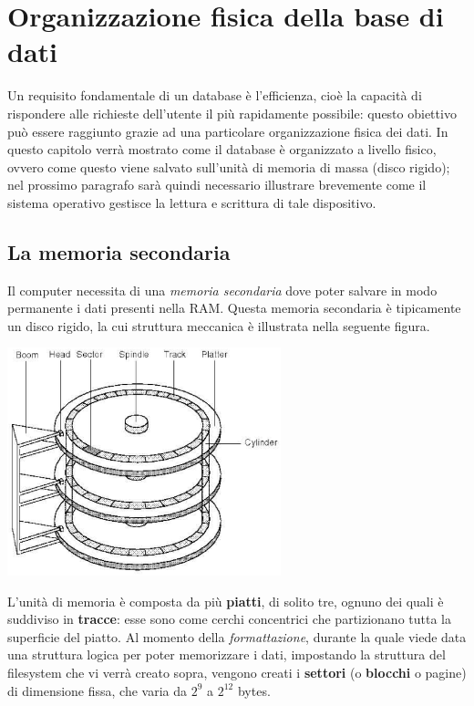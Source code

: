 \section{Organizzazione fisica della base di dati}

Un requisito fondamentale di un database è l'efficienza, cioè la capacità di rispondere alle 
richieste dell'utente il più rapidamente possibile: questo obiettivo può essere raggiunto grazie
ad una particolare organizzazione fisica dei dati. In questo capitolo verrà mostrato come il database
è organizzato a livello fisico, ovvero come questo viene salvato sull'unità di memoria 
di massa (disco rigido); nel prossimo paragrafo sarà quindi necessario illustrare brevemente come il
sistema operativo gestisce la lettura e scrittura di tale dispositivo.

\subsection{La memoria secondaria}
Il computer necessita di una \emph{memoria secondaria} dove poter salvare in modo permanente
i dati presenti nella RAM. Questa memoria secondaria è tipicamente un disco rigido, la cui struttura
meccanica è illustrata nella seguente figura.
\begin{center}
 \includegraphics[width=300px]{img_5_1.eps}
\end{center}
L'unità di memoria è composta da più \textbf{piatti}, di solito tre, ognuno dei quali è suddiviso
in \textbf{tracce}: esse sono come cerchi concentrici che partizionano tutta la superficie del
piatto. Al momento della \emph{formattazione}, durante la quale viede data una struttura logica per 
poter memorizzare i dati, impostando la struttura del filesystem che vi verrà creato sopra, vengono
creati i \textbf{settori} (o \textbf{blocchi} o pagine) di dimensione fissa, che varia da $2^9$ a $2^{12}$
bytes.\\

